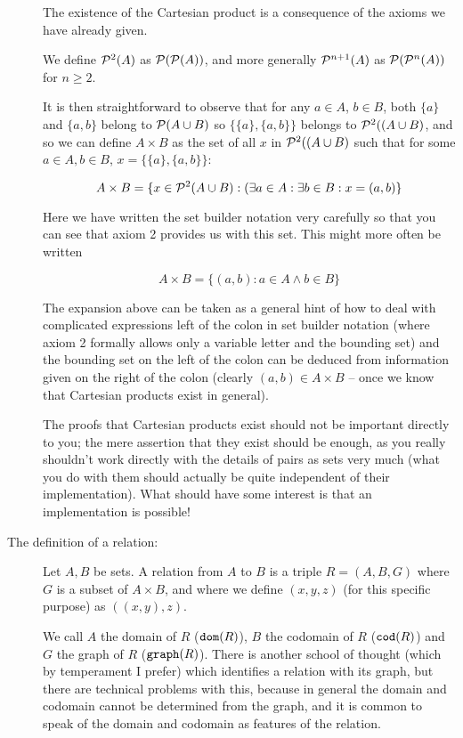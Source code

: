 \documentclass[12pt]{article}
\begin{document}
\begin{description}
The existence of the Cartesian product is a consequence of the axioms we have already given.

We define ${\cal P}^2(A)$ as ${\cal P}({\cal P}(A))$, and more generally ${\cal P}^{n+1}(A)$ as 
${\cal P}({\cal P}^n(A))$ for $n \geq 2$.

It is then straightforward to observe that for any $a \in A$, $b \in B$, both $\{a\}$ and $\{a,b\}$ belong to ${\cal P}(A \cup B)$ so $\{\{a\},\{a,b\}\}$ belongs to ${\cal P}^2((A \cup B)$, and so we can define $A \times B$ as the set of all $x$ in ${\cal P}^2((A \cup B)$ such that for some $a\in A, b\in B$, $x = \{\{a\},\{a,b\}\}$:

$$A \times B = \{x \in {\cal P}^2(A \cup B):(\exists a \in A:\exists b \in B:x=(a,b)\}$$

Here we have written the set builder notation very carefully so that you can see that axiom 2 provides us with this set.  This might more often be written

$$A \times B = \{(a,b):a \in A \wedge b \in B\}$$

The expansion above can be taken as a general hint of how to deal with complicated expressions left of the colon in set builder notation (where axiom 2 formally allows
only a variable letter and the bounding set) and the bounding set on the left of the colon can be deduced from information given on the right of the colon (clearly $(a,b) \in A \times B$ -- once we know that Cartesian products exist in general).

The proofs that Cartesian products exist should not be important directly to you;  the mere assertion that they exist should be enough, as you really shouldn't work directly with the details of pairs as sets very much (what you do with them should actually be quite independent of their implementation).  What should have some interest is that an implementation is possible!

\item[The definition of a relation:]

Let $A,B$ be sets.  A relation from $A$ to $B$ is a triple $R=(A,B,G)$ where $G$ is a subset of $A \times B$, and where we define $(x,y,z)$ (for this specific purpose) as $((x,y),z)$.

We call $A$ the domain of $R$ (${\tt dom}(R)$), $B$ the codomain of $R$ (${\tt cod}(R)$) and $G$ the graph of $R$ (${\tt graph}(R)$).   There is another school of thought
(which by temperament I prefer) which identifies a relation with its graph, but there are technical problems with this, because in general the domain and codomain cannot be determined from the graph, and it is common to speak of the domain and codomain as features of the relation.


\end{description}
\end{document}
